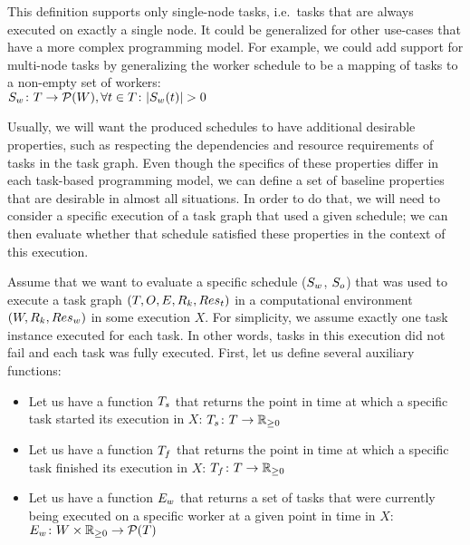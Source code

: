 This definition supports only single-node tasks, i.e.\ tasks that are always executed on exactly a
single node. It could be generalized for other use-cases that have a more complex programming
model. For example, we could add support for multi-node tasks by generalizing the worker schedule
to be a mapping of tasks to a non-empty set of workers: \\ $S_w\colon T \rightarrow \mathcal{P}(W), \forall
	t\in{}T\colon |S_w(t)| > 0$

Usually, we will want the produced schedules to have additional desirable properties, such as
respecting the dependencies and resource requirements of tasks in the task graph. Even though the
specifics of these properties differ in each task-based programming model, we can define a set of
baseline properties that are desirable in almost all situations. In order to do that, we will need
to consider a specific execution of a task graph that used a given schedule; we can then evaluate
whether that schedule satisfied these properties in the context of this execution.

Assume that we want to evaluate a specific schedule ($S_w$,
$S_o$) that was used to execute a task graph $(T, O, E, R_k, Res_t)$ in a
computational environment $(W, R_k, Res_w)$ in some execution $X$. For
simplicity, we assume exactly one task instance executed for each task. In other words, tasks in
this execution did not fail and each task was fully executed. First, let us define several
auxiliary functions:

\newcommand{\timedomain}{\mathbb{R}_{\geq{}0}}

\begin{itemize}
	\item Let us have a function $T_s$ that returns the point in time at which a specific
	      task started its execution in $X$: $\fntaskstart\colon T \rightarrow \timedomain$
	\item Let us have a function $T_f$ that returns the point in time at which a specific
	      task finished its execution in $X$: $\fntaskfinish\colon T \rightarrow \timedomain$
	\item Let us have a function $E_w$ that returns a set of tasks that were currently being
	      executed on a specific worker at a given point in time in $X$:
	      $\fnworkertaskassigned\colon W \times \timedomain \rightarrow \powerset{T}$
\end{itemize}

